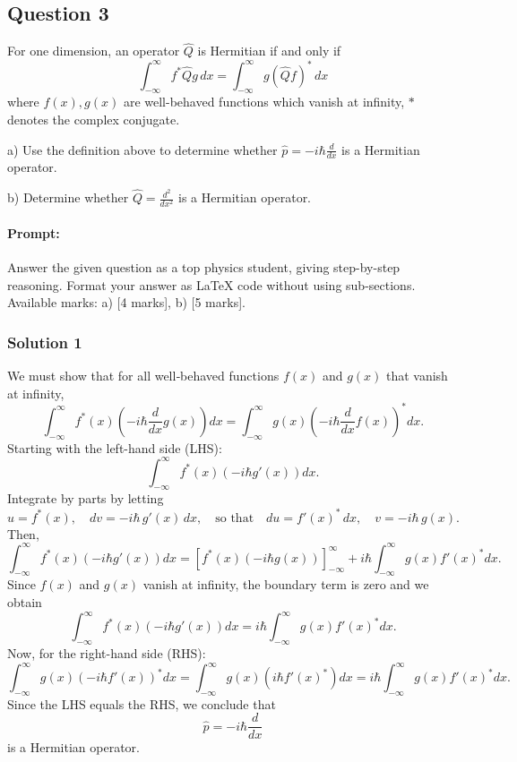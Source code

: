 \documentclass{article}
\begin{document}
\subsection{Question 3} 

For one dimension, an operator $\hat{Q}$ is Hermitian if and only if
\[
\int_{-\infty}^{\infty} f^* \hat{Q} g \, dx = \int_{-\infty}^{\infty} g (\hat{Q} f)^* \, dx
\]
where $f(x), g(x)$ are well-behaved functions which vanish at infinity, $*$ denotes the complex conjugate.

a) Use the definition above to determine whether $\hat{p} = -i\hbar \frac{d}{dx}$ is a Hermitian operator.

b) Determine whether $\hat{Q} = \frac{d^2}{dx^2}$ is a Hermitian operator.

\paragraph{Prompt: \\} 
Answer the given question as a top physics student, giving step-by-step reasoning. Format your answer as LaTeX code without using sub-sections. Available marks: a) [4 marks], b) [5 marks].

\subsubsection{Solution 1}
We must show that for all well‐behaved functions \(f(x)\) and \(g(x)\) that vanish at infinity,
\[
\int_{-\infty}^{\infty} f^*(x) \left(-i\hbar \frac{d}{dx} g(x)\right) dx = \int_{-\infty}^{\infty} g(x) \left(-i\hbar \frac{d}{dx} f(x)\right)^* dx.
\]
Starting with the left-hand side (LHS):
\[
\int_{-\infty}^{\infty} f^*(x) \left(-i\hbar g'(x)\right) dx.
\]
Integrate by parts by letting
\[
u = f^*(x),\quad dv = -i\hbar\, g'(x)\,dx,\quad \text{so that} \quad du = f'(x)^*\,dx,\quad v = -i\hbar\, g(x).
\]
Then,
\[
\int_{-\infty}^{\infty} f^*(x)\left(-i\hbar g'(x)\right)dx = \left[ f^*(x)(-i\hbar g(x)) \right]_{-\infty}^{\infty} + i\hbar \int_{-\infty}^{\infty} g(x) f'(x)^* dx.
\]
Since \(f(x)\) and \(g(x)\) vanish at infinity, the boundary term is zero and we obtain
\[
\int_{-\infty}^{\infty} f^*(x) \left(-i\hbar g'(x)\right)dx = i\hbar \int_{-\infty}^{\infty} g(x) f'(x)^* dx.
\]
Now, for the right-hand side (RHS):
\[
\int_{-\infty}^{\infty} g(x) \left(-i\hbar f'(x)\right)^* dx = \int_{-\infty}^{\infty} g(x) \left(i\hbar f'(x)^*\right) dx = i\hbar \int_{-\infty}^{\infty} g(x) f'(x)^* dx.
\]
Since the LHS equals the RHS, we conclude that
\[
\hat{p} = -i\hbar \frac{d}{dx}
\]
is a Hermitian operator.
\end{document}
